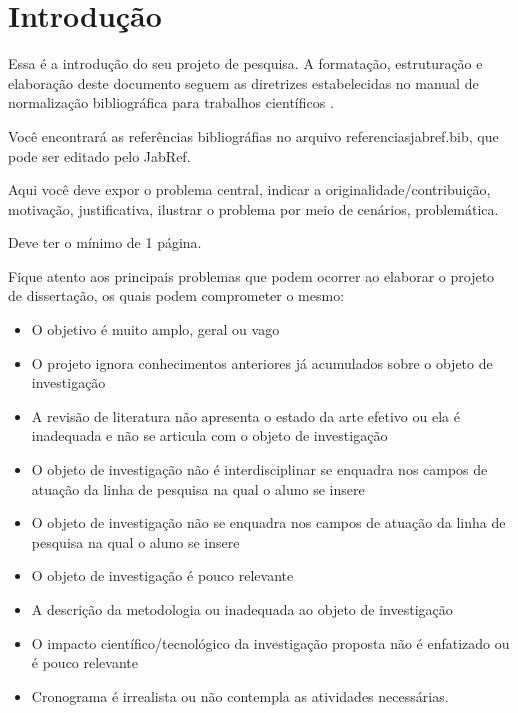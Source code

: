 \chapter{Introdução}

Essa é a introdução do seu projeto de pesquisa. A formatação, estruturação e elaboração deste documento seguem as diretrizes estabelecidas no manual de normalização bibliográfica para trabalhos científicos \cite{UEPG2023}.

Você encontrará as referências bibliográfias no arquivo referenciasjabref.bib, que pode ser editado pelo JabRef.

Aqui você deve expor o problema central, indicar a originalidade/contribuição, motivação, justificativa, ilustrar o problema por meio de cenários, problemática.

Deve ter o mínimo de 1 página.

Fique atento aos principais problemas que podem ocorrer ao elaborar o projeto de dissertação, os quais podem comprometer o mesmo: 

\begin{itemize}
  \item	O objetivo é muito amplo, geral ou vago
  \item	O projeto ignora conhecimentos anteriores já acumulados sobre o objeto de investigação
  \item	A revisão de literatura não apresenta o estado da arte efetivo ou ela é inadequada e não se articula com o objeto de investigação
  \item	O objeto de investigação não é interdisciplinar se enquadra nos campos de atuação da linha de pesquisa na qual o aluno se insere 
  \item	O objeto de investigação não se enquadra nos campos de atuação da linha de pesquisa na qual o aluno se insere 
  \item	O objeto de investigação é pouco relevante
  \item	A descrição da metodologia ou  inadequada ao objeto de investigação  
  \item	O impacto científico/tecnológico da investigação proposta não é enfatizado ou é pouco relevante 
  \item	Cronograma é irrealista ou não contempla as atividades necessárias. 
\end{itemize}